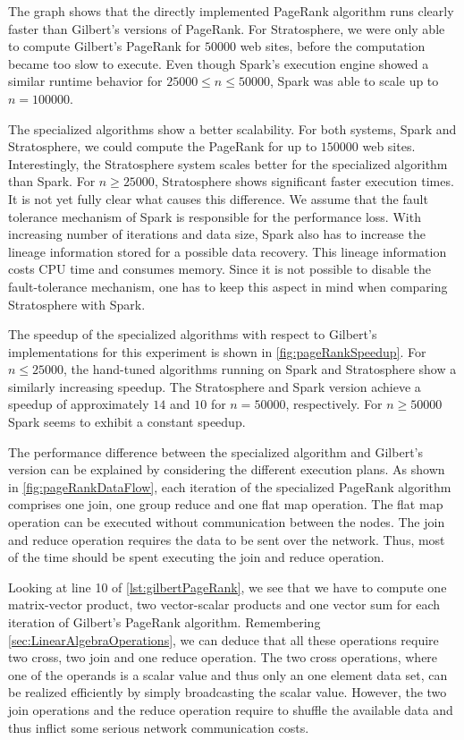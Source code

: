 The graph shows that the directly implemented PageRank algorithm runs clearly faster than Gilbert's versions of PageRank.
For Stratosphere, we were only able to compute Gilbert's PageRank for $50000$ web sites, before the computation became too slow to execute.
Even though Spark's execution engine showed a similar runtime behavior for $25000 \le n \le 50000$, Spark was able to scale up to $n=100000$.

The specialized algorithms show a better scalability.
For both systems, Spark and Stratosphere, we could compute the PageRank for up to $150000$ web sites.
Interestingly, the Stratosphere system scales better for the specialized algorithm than Spark.
For $n\ge 25000$, Stratosphere shows significant faster execution times.
It is not yet fully clear what causes this difference.
We assume that the fault tolerance mechanism of Spark is responsible for the performance loss.
With increasing number of iterations and data size, Spark also has to increase the lineage information stored for a possible data recovery.
This lineage information costs CPU time and consumes memory.
Since it is not possible to disable the fault-tolerance mechanism, one has to keep this aspect in mind when comparing Stratosphere with Spark.

The speedup of the specialized algorithms with respect to Gilbert's implementations for this experiment is shown in \cref{fig:pageRankSpeedup}.
For $n\le 25000$, the hand-tuned algorithms running on Spark and Stratosphere show a similarly increasing speedup.
The Stratosphere and Spark version achieve a speedup of approximately $14$ and $10$ for $n=50000$, respectively.
For $n\ge 50000$ Spark seems to exhibit a constant speedup.

The performance difference between the specialized algorithm and Gilbert's version can be explained by considering the different execution plans.
As shown in \cref{fig:pageRankDataFlow}, each iteration of the specialized PageRank algorithm comprises one join, one group reduce and one flat map operation.
The flat map operation can be executed without communication between the nodes.
The join and reduce operation requires the data to be sent over the network.
Thus, most of the time should be spent executing the join and reduce operation.

Looking at line 10 of \cref{lst:gilbertPageRank}, we see that we have to compute one matrix-vector product, two vector-scalar products and one vector sum for each iteration of Gilbert's PageRank algorithm.
Remembering \cref{sec:LinearAlgebraOperations}, we can deduce that all these operations require two cross, two join and one reduce operation.
The two cross operations, where one of the operands is a scalar value and thus only an one element data set, can be realized efficiently by simply broadcasting the scalar value.
However, the two join operations and the reduce operation require to shuffle the available data and thus inflict some serious network communication costs.

